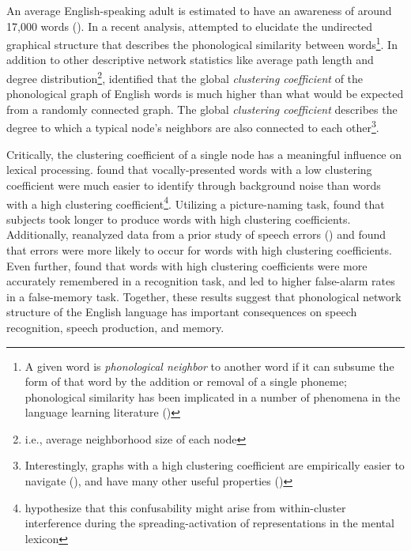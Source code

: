 \documentclass[12pt]{article}
\let\oldcite=\cite
\let\oldtextcite=\textcite
\renewcommand{\cite}[1]{\textcolor[rgb]{0, .121, .388}{\oldcite{#1}}}
\renewcommand{\textcite}[1]{\textcolor[rgb]{0, .121, .388}{\oldtextcite{#1}}}
\begin{document}
An average English-speaking adult is estimated to have an awareness of around 17,000 words (\cite{goulden1990large}). In a recent analysis, \textcite{vitevitch2008can} attempted to elucidate the undirected graphical structure that describes the phonological similarity between words\footnote{A given word is \emph{phonological neighbor} to another word if it can subsume the form of that word by the addition or removal of a single phoneme; phonological similarity has been implicated in a number of phenomena in the language learning literature (\cite{vitevitch2008can})}. In addition to other descriptive network statistics like average path length and degree distribution\footnote{i.e., average neighborhood size of each node}, \textcite{vitevitch2008can} identified that the global \emph{clustering coefficient} of the phonological graph of English words is much higher than what would be expected from a randomly connected graph. The global \emph{clustering coefficient} describes the degree to which a typical node's neighbors are also connected to each other\footnote{Interestingly, graphs with a high clustering coefficient are empirically easier to navigate (\cite{porter2012small}), and have many other useful properties (\cite{vitevitch2008can})}. 

Critically, the clustering coefficient of a single node has a meaningful influence on lexical processing. \textcite{chan2009influence} found that vocally-presented words with a low clustering coefficient were much easier to identify through background noise than words with a high clustering coefficient\footnote{\textcite{chan2009influence} hypothesize that this confusability might arise from within-cluster interference during the spreading-activation of representations in the mental lexicon}. Utilizing a picture-naming task, \textcite{chan2010network} found that subjects took longer to produce words with high clustering coefficients. Additionally, \textcite{chan2010network} reanalyzed data from a prior study of speech errors (\cite{fay1977malapropisms}) and found that errors were more likely to occur for words with high clustering coefficients. Even further, \textcite{vitevitch2012complex} found that words with high clustering coefficients were more accurately remembered in a recognition task, and led to higher false-alarm rates in a false-memory task. Together, these results suggest that phonological network structure of the English language has important consequences on speech recognition, speech production, and memory.
\end{document}
